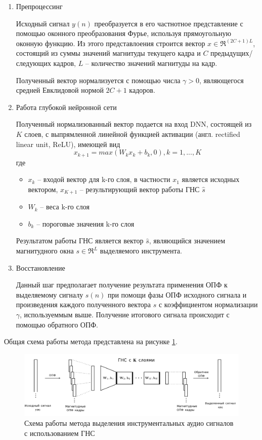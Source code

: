 \begin{enumerate}
	\item Препроцессинг
	
	Исходный сигнал $y(n)$ преобразуется в его частнотное представление с помощью оконного преобразования Фурье, используя прямоугольную оконную функцию. Из этого представлоения строится вектор $x \in \Re^{(2C+1)L}$, состоящий из суммы значений магнитуды текущего кадра и $C$ предыдущих/следующих кадров, $L$ -- количество значений магнитуды на кадр.
	
	Полученный вектор нормализуется с помощью числа $\gamma > 0$, являющегося средней Евклидовой нормой $2C+1$ кадоров.
	
	\item Работа глубокой нейронной сети
	
	Полученный нормализованный вектор подается на вход DNN, состоящей из $K$ слоев, с выпрямленной линейной функцией активации (англ. rectified linear unit, ReLU), имеющей вид
	\begin{equation}
	x_{k+1} = max(W_k x_k + b_k , 0), k = 1, ..., K
	\end{equation}
	где 
	\begin{itemize}
		\item $x_k$ -- входой вектор для k-го слоя, в частности $x_1$ является исходных вектором, $x_{K+1}$ -- результирующий вектор работы ГНС $\hat s$
		\item $W_k$ -- веса k-го слоя
		\item $b_k$ -- пороговые значения k-го слоя
	\end{itemize}

	Результатом работы ГНС является вектор $\hat s$, являющийся значением магнитудного окна $s \in \Re^L$ выделяемого инструмента.
	
	\item Восстановление
	
	Данный шаг предполагает получение результата применения ОПФ к выделяемому сигналу $s(n)$ при помощи фазы ОПФ исходного сигнала и произведения каждого полученного вектора $\hat{s}$ с коэффициентом нормализации $\gamma$, используеммым выше. Получение итогового сигнала происходит с помощью обратного ОПФ.
	
\end{enumerate}

Общая схема работы метода представлена на рисунке \ref{anal:DNN-inst}.

\begin{figure}
	\centering
	\includegraphics[width=\textwidth]{inc/img/DNN-inst.png}
	\caption{Схема работы метода выделения инструментальных аудио сигналов с использованием ГНС}
	\label{anal:DNN-inst}
\end{figure}

